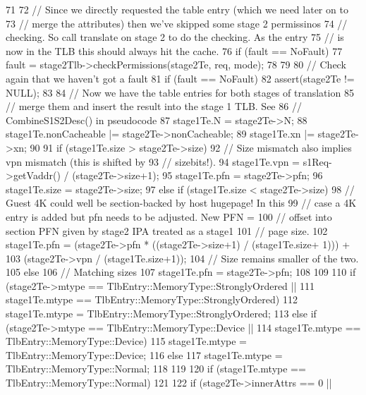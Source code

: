 \begin{DoxyCode}
71 {
72     // Since we directly requested the table entry (which we need later on to
73     // merge the attributes) then we've skipped some stage 2 permissinos
74     // checking. So call translate on stage 2 to do the checking. As the entry
75     // is now in the TLB this should always hit the cache.
76     if (fault == NoFault) {
77         fault = stage2Tlb->checkPermissions(stage2Te, req, mode);
78     }
79 
80     // Check again that we haven't got a fault
81     if (fault == NoFault) {
82         assert(stage2Te != NULL);
83 
84         // Now we have the table entries for both stages of translation
85         // merge them and insert the result into the stage 1 TLB. See
86         // CombineS1S2Desc() in pseudocode
87         stage1Te.N             = stage2Te->N;
88         stage1Te.nonCacheable |= stage2Te->nonCacheable;
89         stage1Te.xn           |= stage2Te->xn;
90 
91         if (stage1Te.size > stage2Te->size) {
92             // Size mismatch also implies vpn mismatch (this is shifted by
93             // sizebits!).
94             stage1Te.vpn  = s1Req->getVaddr() / (stage2Te->size+1);
95             stage1Te.pfn  = stage2Te->pfn;
96             stage1Te.size = stage2Te->size;
97         } else if (stage1Te.size < stage2Te->size) {
98             // Guest 4K could well be section-backed by host hugepage!  In this
99             // case a 4K entry is added but pfn needs to be adjusted.  New PFN =
100             // offset into section PFN given by stage2 IPA treated as a stage1
101             // page size.
102             stage1Te.pfn = (stage2Te->pfn * ((stage2Te->size+1) / (stage1Te.size+
      1))) +
103                            (stage2Te->vpn / (stage1Te.size+1));
104             // Size remains smaller of the two.
105         } else {
106             // Matching sizes
107             stage1Te.pfn = stage2Te->pfn;
108         }
109 
110         if (stage2Te->mtype == TlbEntry::MemoryType::StronglyOrdered ||
111             stage1Te.mtype  == TlbEntry::MemoryType::StronglyOrdered) {
112             stage1Te.mtype  =  TlbEntry::MemoryType::StronglyOrdered;
113         } else if (stage2Te->mtype == TlbEntry::MemoryType::Device ||
114                    stage1Te.mtype  == TlbEntry::MemoryType::Device) {
115             stage1Te.mtype = TlbEntry::MemoryType::Device;
116         } else {
117             stage1Te.mtype = TlbEntry::MemoryType::Normal;
118         }
119 
120         if (stage1Te.mtype == TlbEntry::MemoryType::Normal) {
121 
122             if (stage2Te->innerAttrs == 0 ||
}}}
\end{DoxyCode}

